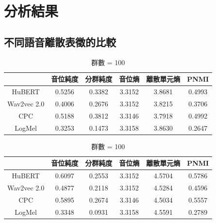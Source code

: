 \section{分析結果}

\subsection{不同語音離散表徵的比較}

{


\begin{table}[!htbp]
    \centering
    \begin{subtable}[t]{\textwidth}
        \centering
        \begin{tabular}{|c|c|c|c|c|c|} \hline
                        & 音位純度   & 分群純度   & 音位熵    & 離散單元熵  & PNMI   \\ \hline
            HuBERT      &     0.5256 &     0.3382 &    3.3152 &      3.8681 & 0.4993 \\ \hline    %
            Wav2vec 2.0 &     0.4006 &     0.2676 &    3.3152 &      3.8215 & 0.3706 \\ \hline    %
            CPC         &     0.5188 &     0.3812 &    3.3146 &      3.7918 & 0.4992 \\ \hline    %
            LogMel      &     0.3253 &     0.1473 &    3.3158 &      3.8630 & 0.2647 \\ \hline    %
        \end{tabular}
        \caption{群數 = 50}
        \label{tab:ch3-clu050-phn}
    \end{subtable}

    \vspace{0.5cm}

    \begin{subtable}[t]{\textwidth}
        \centering
        \begin{tabular}{|c|c|c|c|c|c|} \hline
                        & 音位純度   & 分群純度   & 音位熵    & 離散單元熵  & PNMI   \\ \hline
            HuBERT      &     0.6097 &     0.2553 &    3.3152 &      4.5704 & 0.5786 \\ \hline    %
            Wav2vec 2.0 &     0.4877 &     0.2118 &    3.3152 &      4.5284 & 0.4596 \\ \hline    %
            CPC         &     0.5895 &     0.2674 &    3.3146 &      4.5034 & 0.5557 \\ \hline    %
            LogMel      &     0.3348 &     0.0931 &    3.3158 &      4.5591 & 0.2789 \\ \hline    %
        \end{tabular}
        \caption{群數 = 100}
        \label{tab:ch3-clu100-phn}
    \end{subtable}


\end{table}}

